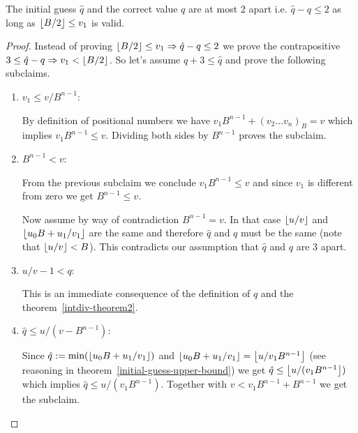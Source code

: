 \begin{theorem}
    The initial guess $\hat q$ and the correct value $q$ are at most 2 apart
    i.e. $\hat q - q \le 2$ as long as $\left\lfloor B/2 \right\rfloor \le v_1$ is valid.

    \begin{proof}

        Instead of proving $\left\lfloor B/2 \right\rfloor \le v_1 \Rightarrow \hat q - q \le 2$
        we prove the contrapositive $3 \le \hat q - q \Rightarrow v_1 < \left\lfloor B/2 \right\rfloor$.
        So let's assume $q + 3 \le \hat q$ and prove the following subclaims.

        \begin{enumerate}
            \item $v_1 \le v / B^{n-1}$:

                By definition of positional numbers we have $v_1 B^{n-1} + (v_2
                \ldots v_n)_B = v$ which implies $v_1 B^{n-1} \le v$. Dividing
                both sides by $B^{n-1}$ proves the subclaim.

            \item $B^{n-1} < v$:

                From the previous subclaim we conclude $v_1 B^{n-1} \le v$ and
                since $v_1$ is different from zero we get $B^{n-1} \le v$.

                Now assume by way of contradiction $B^{n-1} = v$. In that case
                $\left\lfloor u / v \right\rfloor$ and $\left\lfloor u_0 B + u_1 / v_1 \right\rfloor$ are the same and
                therefore $\hat q$ and $q$ must be the same (note that
                $\left\lfloor u/v \right\rfloor < B$). This contradicts our assumption that $\hat
                q$ and $q$ are $3$ apart.

            \item $u/v - 1 < q$:

                This is an immediate consequence of the definition of $q$ and
                the theorem~\ref{intdiv-theorem2}.

            \item $\hat q \le u /(v - B^{n-1})$:

                Since $\hat q := \text{min}(\left\lfloor u_0 B + u_1 / v_1 \right\rfloor)$ and
                $\left\lfloor u_0 B + u_1 / v_1 \right\rfloor = \left\lfloor u / v_1 B^{n-1} \right\rfloor$ (see
                reasoning in theorem~\ref{initial-guess-upper-bound}) we get
                $\hat q \le \left\lfloor u /(v_1 B^{n-1} \right\rfloor)$ which implies
                $\hat q \le u / (v_1 B^{n-1}) $. Together with $v < v_1 B^{n-1}
                + B^{n-1}$ we get the subclaim.


\end{enumerate}
\end{proof}
\end{theorem}
